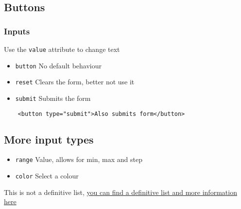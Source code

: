 \subsection{Buttons}

\subsubsection{Inputs}

Use the \texttt{value} attribute to change text

\begin{itemize}
    \item \texttt{button} No default behaviour
    \item \texttt{reset} Clears the form, better not use it
    \item \texttt{submit} Submits the form
\end{itemize}

\begin{verbatim}
    <button type="submit">Also submits form</button>
\end{verbatim}

\subsection{More input types}

\begin{itemize}
    \item \texttt{range} Value, allows for min, max and step
    \item \texttt{color} Select a colour
\end{itemize}


This is not a definitive list, \href{https://developer.mozilla.org/en-US/docs/Web/HTML/Element/input}{you can find a definitive list and more information here}

